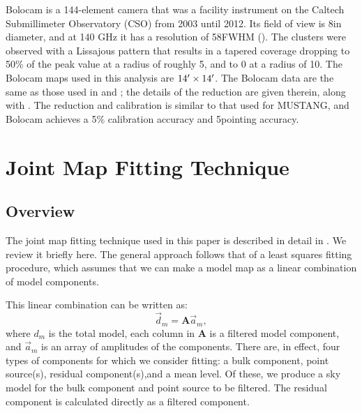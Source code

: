 \documentclass[iop,numberedappendix,apj]{emulateapj}
\begin{document}
Bolocam is a 144-element camera that was a facility instrument on the Caltech Submillimeter Observatory (CSO) from
2003 until 2012. Its field of view is 8\amins in diameter, and at 140 GHz it has a resolution of 58\asec FWHM
(\citet{glenn1998,haig2004}). The clusters were observed with a Lissajous pattern that results in a tapered
coverage dropping to 50\% of the peak value at a radius of roughly 5\amin, and to 0 at a radius of 10\amin.
The Bolocam maps used in this analysis are $14\arcmin \times 14\arcmin$. The Bolocam data are the same as those 
used in \citet{czakon2014} and \citet{sayers2013}; the details of the reduction are given therein, along with \citet{sayers2011}. 
The reduction and calibration is similar to that used for MUSTANG, and Bolocam achieves a 
5\% calibration accuracy and 5\asecs pointing accuracy.

\section{Joint Map Fitting Technique}
\label{sec:jointfitting}

\subsection{Overview}
\label{sec:jf_overview}

The joint map fitting technique used in this paper is described in detail in \citet{romero2015a}. We review
it briefly here. The general approach follows that of a least squares fitting procedure, which assumes that
we can make a model map as a linear combination of model components. 

This linear combination can be written as:
\begin{equation}
  \vec{d}_m = \mathbf{A} \vec{a}_m,
\end{equation}
where $d_m$ is the total model, each column in $\mathbf{A}$ is a filtered model component, and $\vec{a}_m$ is 
an array of amplitudes of the components. There are, in effect, four types of components for which we consider 
fitting: a bulk component, point source(s), residual component(s),and a mean level. Of these, we produce a
sky model for the bulk component and point source to be filtered. The residual component is calculated directly
as a filtered component.
\end{document}
